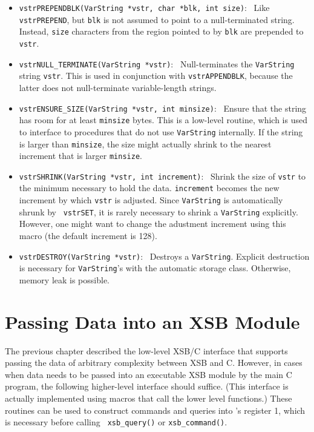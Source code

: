 \begin{itemize}
  \item {\tt vstrPREPENDBLK(VarString *vstr, char *blk, int size)}:~
    Like {\tt vstrPREPEND}, but {\tt blk} is not assumed to point to a
    null-terminated string. Instead, {\tt size} characters from the region
    pointed to by {\tt blk} are prepended to {\tt vstr}.
  \item {\tt vstrNULL\_TERMINATE(VarString *vstr)}:~
    Null-terminates the {\tt VarString}  string {\tt vstr}. This is used in
    conjunction with {\tt vstrAPPENDBLK}, because the latter does not
    null-terminate variable-length strings.
  \item {\tt vstrENSURE\_SIZE(VarString *vstr, int minsize)}:~
    Ensure that the string has room for at least {\tt minsize} bytes.
    This is a low-level routine, which is used to interface to procedures
    that do not use {\tt VarString} internally. If the string is larger
    than {\tt minsize}, the size might actually shrink to the nearest
    increment that is larger {\tt minsize}.
  \item {\tt vstrSHRINK(VarString *vstr, int increment)}:~
    Shrink the size of {\tt vstr} to the minimum necessary to hold the
    data. {\tt increment} becomes the new increment by which {\tt vstr} is
    adjusted. Since {\tt VarString} is automatically shrunk by {\tt
      vstrSET}, it is rarely necessary to shrink a {\tt VarString} explicitly.
    However, one might want to change the adustment increment using this
    macro (the default increment is 128).
  \item {\tt vstrDESTROY(VarString *vstr)}:~
    Destroys a {\tt VarString}.  Explicit destruction is necessary for
    {\tt VarString}'s with the automatic storage class. Otherwise, memory
    leak is possible.
\end{itemize}


\section{Passing Data into an XSB Module}

The previous chapter described the low-level XSB/C interface that supports
passing the data of arbitrary complexity between XSB and C. However, in
cases when data needs to be passed into an executable XSB module by the
main C program, the following higher-level interface should suffice.  (This
interface is actually implemented using macros that call the lower level
functions.)  These routines can be used to construct commands and queries
into \ourprolog 's register 1, which is necessary before calling {\tt
  xsb\_query()} or {\tt xsb\_command()}.


